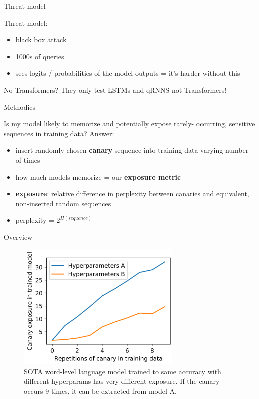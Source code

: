 \documentclass{beamer}
\begin{document}
\begin{frame}{Threat model}

Threat model:
\begin{itemize}
\item black box attack
\item 1000s of queries
\item sees logits / probabilities of the model outputs = it's harder without this
\end{itemize}

\vfill

\begin{block}{No Transformers?}
They only test LSTMs and qRNNS not Transformers!
\end{block}

\end{frame}
\begin{frame}{Methodics}

Is my model likely to memorize and potentially expose rarely- occurring, sensitive sequences in training data?
\vfill
Answer:
\begin{itemize}
\item insert randomly-chosen \textbf{canary} sequence into training data varying number of times
\item how much models memorize = our \textbf{exposure metric} 
\item \textbf{exposure}: relative difference in perplexity between canaries and equivalent, non-inserted random sequences
\item perplexity = $2^{H(sequence)}$
\end{itemize}

\end{frame}
\begin{frame}{Overview}

\begin{figure}[h]
\includegraphics[width=0.7\textwidth]{img/fig1}
\caption{SOTA word-level language model trained to same accuracy with different hyperparams has very different exposure. If the canary occurs 9 times, it can be extracted from model A.}
\end{figure}

\end{frame}
\end{document}
